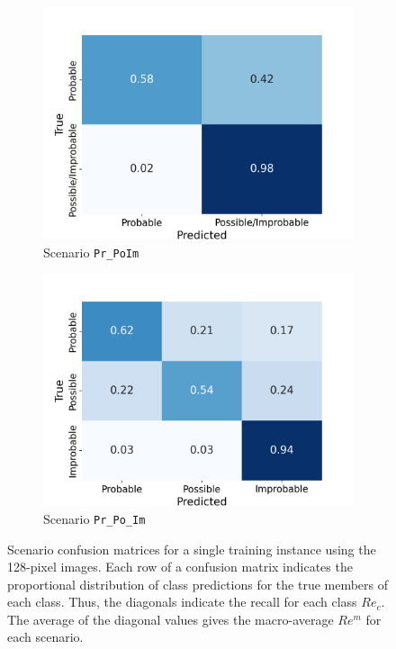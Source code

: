\documentclass[Journal, letterpaper, DoubleSpace, InsideFigs]{ascelike-new}
\begin{document}
\begin{figure}[ht]
  \begin{subfigure}[t]{.45\linewidth}
    \centering
    \includegraphics[width=\linewidth, trim={0 0 1cm 1cm}, clip]{opt-confusion-matrix-Pr_PoIm-128-px.png}
    \caption{Scenario \texttt{Pr\_PoIm}}
    \label{pr_poim_cm}
\end{subfigure}%
  \begin{subfigure}[t]{.45\linewidth}
    \centering
    \includegraphics[width=\linewidth, trim={0 0 1cm 1cm}, clip]{opt-confusion-matrix-Pr_Po_Im-128-px.png}
    \caption{Scenario \texttt{Pr\_Po\_Im}}
    \label{pr_po_im_cm}
  \end{subfigure}%
  \caption{Scenario confusion matrices for a single training instance using the 128-pixel images.  Each row of a
    confusion matrix indicates the proportional distribution of class predictions for the true members of each
    class. Thus, the diagonals indicate the recall for each class $Re_c$. The average of the diagonal values gives the
    macro-average $Re^m$ for each scenario.}
    \label{fig:confusion-matrix}
  \end{figure}
\end{document}
